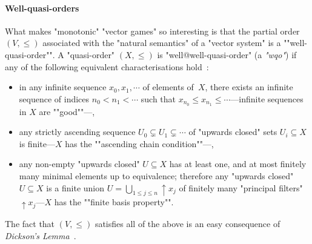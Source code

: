 \paragraph{Well-quasi-orders}\AP What makes "monotonic" "vector games" so
interesting is that the partial order $(V,{\leq})$ associated with the
"natural semantics" of a "vector system" is a ""well-quasi-order"".  A
"quasi-order" $(X,{\leq})$ is "well@well-quasi-order" (a \emph{"wqo"})
if any of the following equivalent characterisations
hold~\cite{Kruskal:1972,Schmitz&Schnoebelen:2012}:
\begin{itemize}
  \item\AP in any infinite sequence $x_0,x_1,\cdots$ of elements
    of~$X$, there exists an infinite sequence of indices
    $n_0<n_1<\cdots$ such that $x_{n_0}\leq
    x_{n_1}\leq\cdots$---infinite sequences in $X$ are ""good""---,
  \item\AP any strictly ascending sequence $U_0\subsetneq
    U_1\subsetneq\cdots$ of "upwards closed" sets $U_i\subseteq X$ is
    finite---$X$ has the ""ascending chain condition""---,
  \item\AP any non-empty "upwards closed" $U\subseteq X$ has at least
    one, and at most finitely many minimal elements up to equivalence;
    therefore any "upwards closed" $U\subseteq X$ is a finite union
    $U=\bigcup_{1\leq j\leq n}{\uparrow}x_j$ of finitely many
    "principal filters"~${\uparrow}x_j$---$X$ has the ""finite basis
    property"".
\end{itemize}

The fact that $(V,{\leq})$ satisfies all of the above is an easy
consequence of \emph{Dickson's Lemma}~\cite{Dickson:1913}.


